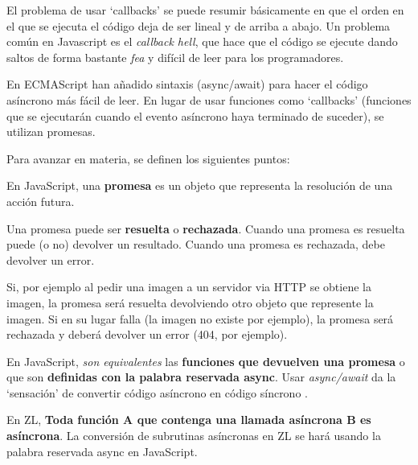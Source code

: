 \documentclass{report}
\begin{document}
	\vspace{10px}

	El problema de usar `callbacks' se puede resumir básicamente en que el orden en el que se ejecuta el código deja de ser lineal y de arriba a abajo. Un problema común en Javascript es el \textit{callback hell}\cite{callbackhell}, que hace que el código se ejecute dando saltos de forma bastante \textit{fea} y difícil de leer para los programadores. 
	
	En ECMAScript han añadido sintaxis (async/await) para hacer el código asíncrono más fácil de leer. En lugar de usar funciones como `callbacks' (funciones que se ejecutarán cuando el evento asíncrono haya terminado de suceder), se utilizan promesas. 
		
	Para avanzar en materia, se definen los siguientes puntos:

	\vspace{10px}
	\noindent
	En JavaScript, una \textbf{promesa} es un objeto que representa la resolución de una acción futura. 
	
	\vspace{10px}
	
	\noindent
	Una promesa puede ser \textbf{resuelta} o \textbf{rechazada}. Cuando una promesa es resuelta puede (o no) devolver un resultado. Cuando una promesa es rechazada, debe devolver un error.
	
	\vspace{10px}
	
	\noindent
	Si, por ejemplo al pedir una imagen a un servidor via HTTP se obtiene la imagen, la promesa será resuelta devolviendo otro objeto que represente la imagen. Si en su lugar falla (la imagen no existe por ejemplo), la promesa será rechazada y deberá devolver un error (404, por ejemplo). 

	\vspace{10px}
	
	\noindent
	En JavaScript, \textit{son equivalentes} las \textbf{funciones que devuelven una promesa} o que son \textbf{definidas con la palabra reservada async}. Usar \textit{async/await} da la `sensación' de convertir código asíncrono en código síncrono \cite{stackoverflow-asyncawait}.

	\vspace{10px}
	
	\noindent
	En ZL, \textbf{Toda función A que contenga una llamada asíncrona B es asíncrona}. La conversión de subrutinas asíncronas en ZL se hará usando la palabra reservada async en JavaScript.  
	
\end{document}

